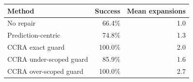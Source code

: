 \begin{tabular}{lrr}
\toprule
Method & Success & Mean expansions \\
\midrule
No repair & 66.4\% & 1.0 \\
Prediction-centric & 74.8\% & 1.3 \\
CCRA exact guard & 100.0\% & 2.0 \\
CCRA under-scoped guard & 85.9\% & 1.6 \\
CCRA over-scoped guard & 100.0\% & 2.7 \\
\bottomrule
\end{tabular}
